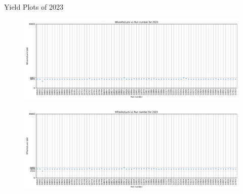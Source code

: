 \begin{frame}{Yield Plots of 2023}
    \begin{figure}
        \centering
        \includegraphics[width=1.0\textwidth]{plots_runwise/NEventsbyLumi_2023.pdf}
    \end{figure}
    \vspace{-0.35cm}
    \begin{figure}
        \centering
        \includegraphics[width=1.0\textwidth]{plots_runwise/NTracksbyLumi_2023.pdf}
    \end{figure}
\end{frame}



